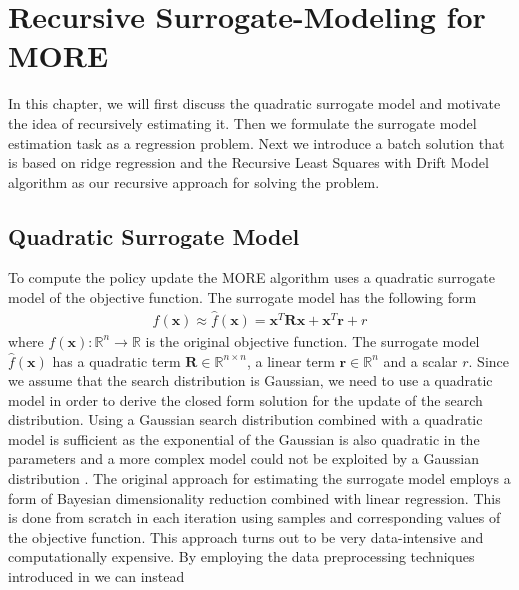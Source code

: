 
\chapter{Recursive Surrogate-Modeling for MORE}
In this chapter, we will first discuss the quadratic surrogate model
and motivate the idea of recursively
estimating it.
Then we formulate the surrogate model estimation task
as a regression problem.
Next we introduce a batch solution
that is based on ridge regression and
the Recursive Least Squares with Drift Model algorithm
as our recursive approach for solving the problem.

\section{Quadratic Surrogate Model}
\label{sec:surrogate}
To compute the policy update the MORE algorithm
uses a quadratic surrogate model of the objective function.
The surrogate model has the following form
\begin{align*}
  f(\mathbf{x}) \approx \hat{f}(\mathbf{x}) =
  \mathbf{x}^T \mathbf{R} \mathbf{x}
  + \mathbf{x}^T \mathbf{r} + r
\end{align*}
where $f(\mathbf{x}) : \mathbb{R}^n \rightarrow \mathbb{R}$
is the original objective function.
The surrogate model $\hat{f}(\mathbf{x})$
has a quadratic term $\mathbf{R} \in \mathbb{R}^{n \times n}$,
a linear term $\mathbf{r} \in \mathbb{R}^{n}$ and a scalar $r$.
Since we assume that the search distribution is Gaussian,
we need to use a quadratic model in order to derive the closed
form solution for the update of the search distribution.
Using a Gaussian search distribution combined with a
quadratic model is sufficient as the exponential of the
Gaussian is also quadratic in the parameters and
a more complex model could not be exploited by
a Gaussian distribution \citep{abdolmaleki2015model}.
The original approach for estimating the surrogate model
employs a form of Bayesian dimensionality
reduction combined with linear regression.
This is done from scratch in each
iteration using samples and corresponding
values of the objective function. 
This approach turns out to be very data-intensive and computationally
expensive.
By employing the data preprocessing techniques introduced in
 we can instead
